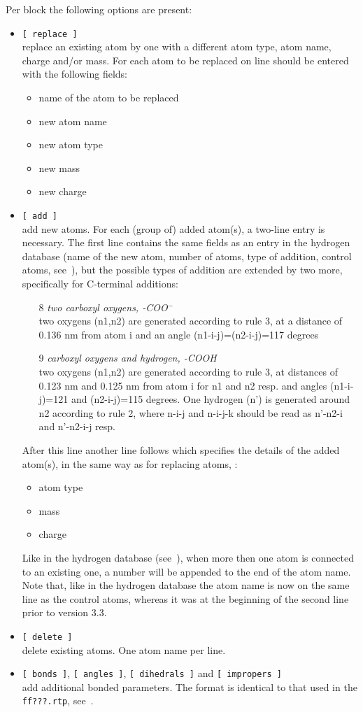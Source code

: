 Per block the following options are present:
\begin{itemize}
\item {\tt [~replace~]} \\
replace an existing atom by one with a different atom type, atom name,
charge and/or mass. For each atom to be replaced on line should be
entered with the following fields:
\begin{itemize}
\item name of the atom to be replaced
\item new atom name
\item new atom type
\item new mass
\item new charge
\end{itemize}
\item {\tt [~add~]} \\
add new atoms. For each (group of) added atom(s), a two-line entry is
necessary. The first line contains the same fields as an entry in the
hydrogen database (name of the new atom, 
number of atoms, type of addition, control atoms,
see~), but the possible types of addition are extended
by two more, specifically for C-terminal additions:
\begin{enumerate}
\item[8]{\em two carboxyl oxygens, -COO{$^-$}}\\
two oxygens (n1,n2) are generated according to rule 3, at a distance
of 0.136 nm from atom i and an angle (n1-i-j)=(n2-i-j)=117 degrees
\item[9]{\em carboxyl oxygens and hydrogen, -COOH}\\
two oxygens (n1,n2) are generated according to rule 3, at distances of
0.123 nm and 0.125 nm from atom i for n1 and n2 resp. and angles
(n1-i-j)=121 and (n2-i-j)=115 degrees. One hydrogen (n') is generated
around n2 according to rule 2, where n-i-j and n-i-j-k should be read
as n'-n2-i and n'-n2-i-j resp.
\end{enumerate}
After this line another line follows which specifies the details of
the added atom(s), in the same way as for replacing atoms, {\ie}: 
\begin{itemize}
\item atom type
\item mass
\item charge
\end{itemize}
Like in the hydrogen database (see~), when more then
one atom is connected to an existing one, a number will be appended to
the end of the atom name. Note that, like in the hydrogen database the
atom name is now on the same line as the control atoms, whereas it was
at the beginning of the second line prior to {\gromacs} version 3.3.
\item {\tt [~delete~]}\\
delete existing atoms. One atom name per line.
\item {\tt [~bonds~]}, {\tt [~angles~]}, {\tt [~dihedrals~]} and {\tt [~impropers~]}\\
add additional bonded parameters. The format is identical to that used
in the {\tt ff???.rtp}, see~.
\end{itemize}

